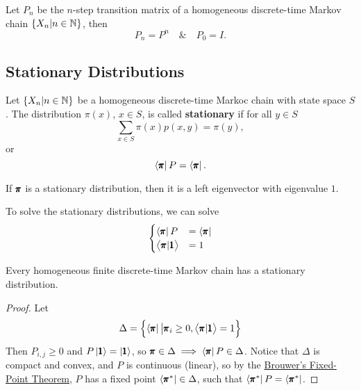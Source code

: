 \begin{corollary}
    Let $P_n$ be the $n$-step transition matrix of a homogeneous discrete-time Markov chain $\{X_n | n \in \mathbb{N}\}$, then 
    \begin{equation*}
        P_n = P^n \quad \& \quad P_0 = I.
    \end{equation*}
\end{corollary}

\subsection{Stationary Distributions}

\begin{definition}[Stationarity]
    Let $\{ X_n | n \in \mathbb{N} \}$ be a homogeneous discrete-time Markoc chain with state space $S$. The distribution $\pi(x)$, $x \in S$, is called \textbf{stationary} if for all $y \in S$
    \begin{equation*}
        \sum_{x \in S} \pi(x) p(x,y) = \pi(y),
    \end{equation*}
    or 
    \begin{equation*}
        \left< \pmb{\pi} \right| P = \left< \pmb{\pi} \right|.
    \end{equation*}
\end{definition}

\begin{remark}
    If $\pmb{\pi}$ is a stationary distribution, then it is a left eigenvector with eigenvalue $1$.
\end{remark}

\begin{remark}
    To solve the stationary distributions, we can solve 
    \begin{equation*}
        \begin{cases}
            \left< \pmb{\pi} \right| P & = \left< \pmb{\pi} \right| \\ 
            \left< \pmb{\pi} | \pmb{1} \right > & = 1
        \end{cases}
    \end{equation*}
\end{remark}

\begin{theorem}
    Every homogeneous finite discrete-time Markov chain has a stationary distribution.
\end{theorem}
\begin{proof}
    Let 
    \begin{equation*}
        \Delta = \left\{ \left< \pmb{\pi} \right| \big | \pmb{\pi}_i \ge 0, \left<\pmb{\pi} | \pmb{1} \right> = 1 \right\}
    \end{equation*}
    Then $P_{i,j} \ge 0$ and $P \left| \pmb{1} \right> = \left| \pmb{1} \right>$, so $\pmb{\pi} \in \Delta \implies \left< \pmb{\pi} \right| P \in \Delta$. Notice that $\Delta$ is compact and convex, and $P$ is continuous (linear), so by the \href{https://en.wikipedia.org/wiki/Brouwer_fixed-point_theorem}{Brouwer's Fixed-Point Theorem}, $P$ has a fixed point $\left< \pmb{\pi}^* \right| \in \Delta$, such that $\left< \pmb{\pi}^* \right| P = \left< \pmb{\pi}^* \right|$.
\end{proof}

